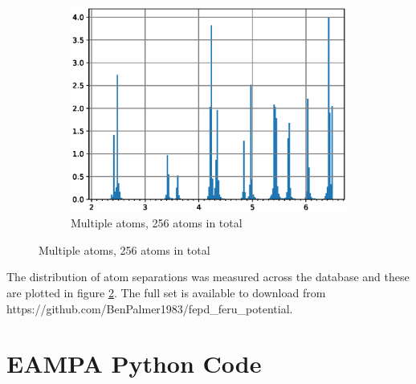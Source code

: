 \begin{figure}
\begin{subfigure}{.32\textwidth}
  \centering
  \includegraphics[width=.94\linewidth]{chapters/potentials_fe_pd_ru/neighbour_distances/db_feru_neighbours.eps}  
  \caption{Multiple atoms, 256 atoms in total}
  \label{fig:sub-first}
\end{subfigure}
\label{fig:dbneighbourseparations}
\end{figure}

The distribution of atom separations was measured across the database and these are plotted in figure \ref{fig:dbneighbourseparations}.  The full set is available to download from https://github.com/BenPalmer1983/fepd\_feru\_potential.



















\FloatBarrier
\section{EAMPA Python Code}
\label{code:eampa}




